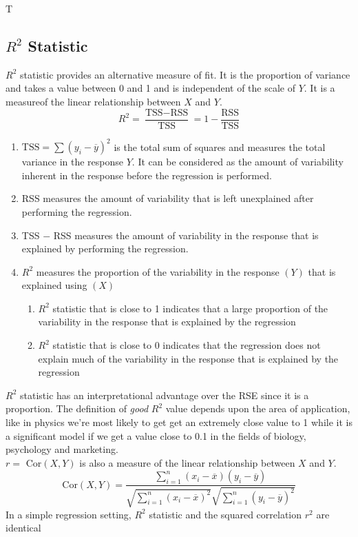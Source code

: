 T\documentclass{article}
\begin{document}
\subsection*{$R^{2}$ Statistic}
$R^2$ statistic provides an alternative measure of fit. It is the proportion of variance and takes a value between 0 and 1 and is independent of the scale of $Y$. It is a measureof the linear relationship between $X$ and $Y$.
\begin{equation*} R^2 = \frac{\text{TSS}-\text{RSS}}{\text{TSS}} = 1 - \frac{\text{RSS}}{\text{TSS}} \end{equation*}
\begin{enumerate}
    \item $\text{TSS} = \sum {(y_i - \overline{y})}^2$ is the total sum of squares and measures the total variance in the response $Y$. It can be considered as the amount of variability inherent in the response before the regression is performed.
    \item RSS measures the amount of variability that is left unexplained after performing the regression. 
    \item TSS $-$ RSS measures the amount of variability in the response that is explained by performing the regression. 
    \item $R^2$ measures the proportion of the variability in the response $(Y)$ that is explained using $(X)$
    \begin{enumerate}
        \item $R^2$ statistic that is close to 1 indicates that a large proportion of the variability in the response that is explained by the regression
        \item $R^2$ statistic that is close to 0 indicates that the regression does not explain much of the variability in the response that is explained by the regression
    \end{enumerate}
\end{enumerate}
\vspace{2mm}
$R^2$ statistic has an interpretational advantage over the RSE since it is a proportion. The definition of \textit{good} $R^2$ value depends upon the area of application, like in physics we're most likely to get get an extremely close value to 1 while it is a significant model if we get a value close to 0.1 in the fields of biology, psychology and marketing. \\
$r =$ Cor$(X,Y)$ is also a measure of the linear relationship between $X$ and $Y$. 
\begin{equation*} \text{Cor}(X,Y) = \frac{\sum_{i=1}^{n} (x_i - \overline{x})(y_i - \overline{y})}{\sqrt{\sum_{i=1}^{n} {(x_i - \overline{x})}^2} \sqrt{\sum_{i=1}^{n} {(y_i - \overline{y})}^2}}  \end{equation*}
In a simple regression setting, $R^2$ statistic and the squared correlation $r^2$ are identical 
\end{document}
